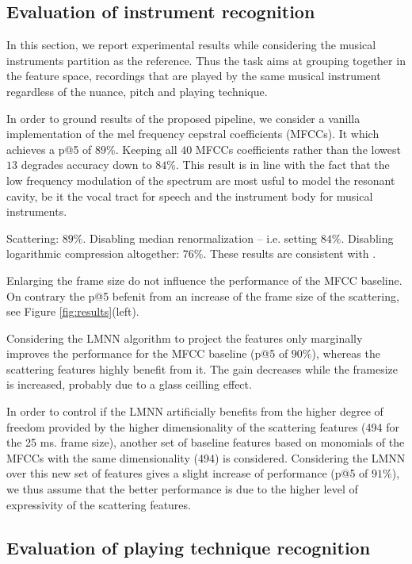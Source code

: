 \documentclass{article}
\makeatletter
\newcommand*{\ie}{i.e.\@\xspace}
\makeatother
\begin{document}
\subsection{Evaluation of instrument recognition}

In this section, we report experimental results while considering the musical instruments partition as the reference. Thus the task aims at grouping together in the feature space, recordings that are played by the same musical instrument regardless of the nuance, pitch and playing technique.

In order to ground results of the proposed pipeline, we consider a vanilla implementation of the mel frequency cepstral coefficients (MFCCs). It which achieves a p@5 of $89\%$. Keeping all $40$ MFCCs coefficients rather than the lowest $13$ degrades accuracy down to $84\%$. This result is in line with the fact that the low frequency modulation of the spectrum are most usful to model the resonant cavity, be it the vocal tract for speech and the instrument body for musical instruments.

Scattering: $89\%$.
Disabling median renormalization -- \ie{} setting  $84\%$.
Disabling logarithmic compression altogether: $76\%$.
These results are consistent with \cite{lostanlen2018eurasip}.

Enlarging the frame size do not influence the performance of the MFCC baseline. On contrary the p@5 befenit from an increase of the frame size of the scattering, see Figure \ref{fig:results}(left).

Considering the LMNN algorithm to project the features only marginally improves the performance for the MFCC baseline (p@5 of $90\%$), whereas the scattering features highly benefit from it. The gain decreases while the framesize is increased, probably due to a glass ceilling effect.

In order to control if the LMNN artificially benefits from the higher degree of freedom provided by the higher dimensionality of the scattering features (494 for the 25 ms. frame size), another set of baseline features based on monomials of the MFCCs with the same dimensionality (494) is considered. Considering the LMNN over this new set of features gives a slight increase of performance (p@5 of $91\%$), we thus assume that the better performance is due to the higher level of expressivity of the scattering features.

\subsection{Evaluation of playing technique recognition}
\end{document}

